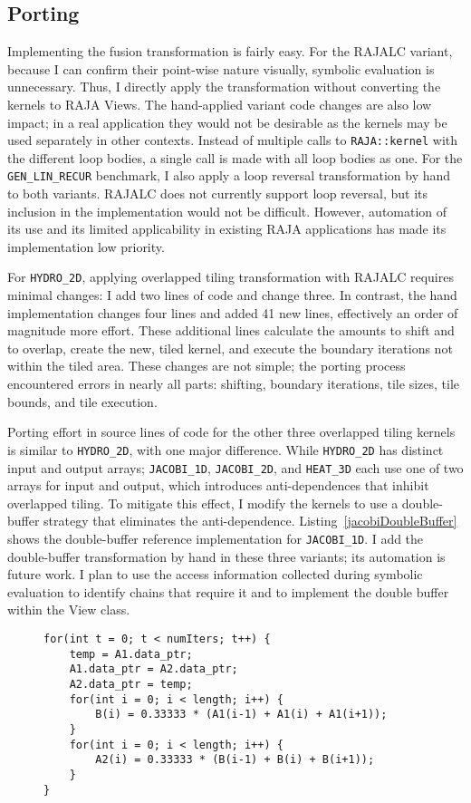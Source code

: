 \subsection{Porting}

Implementing the fusion transformation is fairly easy. 
For the RAJALC variant, because I can confirm their point-wise nature
visually, symbolic evaluation is unnecessary.
Thus, I directly apply the transformation without converting the kernels to 
RAJA Views.
The hand-applied variant code changes are also low impact; in a real
application they would not be desirable as the kernels may be used separately
in other contexts.
Instead of multiple calls to \verb.RAJA::kernel. with the different loop
bodies, a single call is made with all loop bodies as one.
For the \verb.GEN_LIN_RECUR. benchmark, I also apply a loop reversal
transformation by hand to both variants. RAJALC does not currently support 
loop reversal, but its inclusion in the implementation would not be difficult.
However, automation of its use and its limited applicability in 
existing RAJA applications has made its implementation low priority. 

For \verb.HYDRO_2D., applying overlapped tiling transformation with RAJALC 
requires minimal changes: I add two lines of code and change three. 
In contrast, the hand implementation changes four lines and added 41
new lines, effectively an order of magnitude more effort. 
These additional lines calculate the amounts to shift and to overlap, 
create the new, tiled kernel, and execute the boundary iterations not
within the tiled area. 
These changes are not simple; the porting process encountered errors
in nearly all parts: shifting, boundary iterations, tile sizes, tile
bounds, and tile execution.

Porting effort in source lines of code
for the other three overlapped tiling kernels is similar to 
\verb.HYDRO_2D., with one major difference.  
While \verb.HYDRO_2D. has distinct input and output arrays; \verb.JACOBI_1D., 
\verb.JACOBI_2D., and \verb.HEAT_3D. each use one of two arrays for
input and output, which introduces anti-dependences that inhibit 
overlapped tiling. 
To mitigate this effect, I modify the kernels to use
a double-buffer strategy that eliminates the anti-dependence. 
Listing~\ref{jacobiDoubleBuffer} shows the double-buffer reference
implementation for \verb.JACOBI_1D..
I add the double-buffer transformation by hand in these three variants;
its automation is future work.
I plan to use the access information collected during symbolic evaluation
to identify chains that require it and to implement the double buffer within
the View class.
\begin{figure}[t]
\begin{lstlisting}[label={jacobiDoubleBuffer},caption={Double-Buffer Implementation for JACOBI\_1D}]
for(int t = 0; t < numIters; t++) {
	temp = A1.data_ptr;
	A1.data_ptr = A2.data_ptr;
	A2.data_ptr = temp;
	for(int i = 0; i < length; i++) {
		B(i) = 0.33333 * (A1(i-1) + A1(i) + A1(i+1));
	}
	for(int i = 0; i < length; i++) {
		A2(i) = 0.33333 * (B(i-1) + B(i) + B(i+1));
	}
}
\end{lstlisting}
\end{figure}

